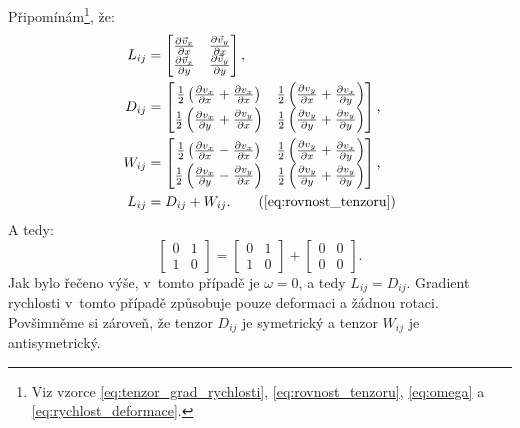 \documentclass[12pt]{article}
\begin{document}
Připomínám\footnote{Viz vzorce \ref{eq:tenzor_grad_rychlosti}, \ref{eq:rovnost_tenzoru}, \ref{eq:omega} a \ref{eq:rychlost_deformace}.}, že:
\begin{align}
    L_{ij} &= 
    \begin{bmatrix}
        \frac{\partial \vec{v}_x}{\partial x} & \frac{\partial \vec{v}_y}{\partial x} \\
        \frac{\partial \vec{v}_x}{\partial y} & \frac{\partial \vec{v}_y}{\partial y} \\
    \end{bmatrix}\text{,}\\
    D_{ij} &= 
    \begin{bmatrix}
        \frac{1}{2}\left(\frac{\partial v_x}{\partial x} + \frac{\partial v_x}{\partial x}\right) & \frac{1}{2}\left(\frac{\partial v_y}{\partial x} + \frac{\partial v_x}{\partial y}\right) \\
        \frac{1}{2}\left(\frac{\partial v_x}{\partial y} + \frac{\partial v_y}{\partial x}\right) & \frac{1}{2}\left(\frac{\partial v_y}{\partial y} + \frac{\partial v_y}{\partial y}\right) \\
    \end{bmatrix}\text{,}\\
    W_{ij} &=
    \begin{bmatrix}
        \frac{1}{2}\left(\frac{\partial v_x}{\partial x} - \frac{\partial v_x}{\partial x}\right) & \frac{1}{2}\left(\frac{\partial v_y}{\partial x} + \frac{\partial v_x}{\partial y}\right) \\
        \frac{1}{2}\left(\frac{\partial v_x}{\partial y} - \frac{\partial v_y}{\partial x}\right) & \frac{1}{2}\left(\frac{\partial v_y}{\partial y} + \frac{\partial v_y}{\partial y}\right) \\
    \end{bmatrix}\text{,}\\
    L_{ij} &= D_{ij} + W_{ij}\text{.} \tag{\ref{eq:rovnost_tenzoru}}
\end{align}
A tedy:
\begin{equation}
    \begin{bmatrix}
        0 & 1\\
        1 & 0
    \end{bmatrix} =
    \begin{bmatrix}
        0 & 1\\
        1 & 0
    \end{bmatrix} +
    \begin{bmatrix}
        0 & 0\\
        0 & 0
    \end{bmatrix}\text{.}
\end{equation}
Jak bylo řečeno výše, v~tomto případě je $\omega = 0$, a tedy $L_{ij} = D_{ij}$. Gradient rychlosti v~tomto případě způsobuje pouze deformaci a žádnou rotaci. Povšimněme si zároveň, že tenzor $D_{ij}$ je symetrický a tenzor $W_{ij}$ je antisymetrický.~\cite{wiki:Strain_rate_tensor}
\end{document}

